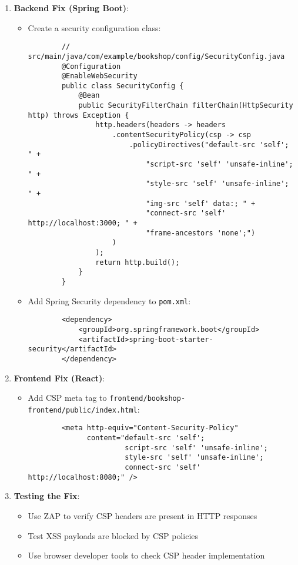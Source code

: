 \documentclass[]{UCD_CS_FYP_Report}
\begin{document}
\begin{enumerate}
    \item \textbf{Backend Fix (Spring Boot)}:
    \begin{itemize}
        \item Create a security configuration class:
        \begin{verbatim}
        // src/main/java/com/example/bookshop/config/SecurityConfig.java
        @Configuration
        @EnableWebSecurity
        public class SecurityConfig {
            @Bean
            public SecurityFilterChain filterChain(HttpSecurity http) throws Exception {
                http.headers(headers -> headers
                    .contentSecurityPolicy(csp -> csp
                        .policyDirectives("default-src 'self'; " +
                            "script-src 'self' 'unsafe-inline'; " +
                            "style-src 'self' 'unsafe-inline'; " +
                            "img-src 'self' data:; " +
                            "connect-src 'self' http://localhost:3000; " +
                            "frame-ancestors 'none';")
                    )
                );
                return http.build();
            }
        }
        \end{verbatim}
        
        \item Add Spring Security dependency to \texttt{pom.xml}:
        \begin{verbatim}
        <dependency>
            <groupId>org.springframework.boot</groupId>
            <artifactId>spring-boot-starter-security</artifactId>
        </dependency>
        \end{verbatim}
    \end{itemize}
    
    \item \textbf{Frontend Fix (React)}:
    \begin{itemize}
        \item Add CSP meta tag to \texttt{frontend/bookshop-frontend/public/index.html}:
        \begin{verbatim}
        <meta http-equiv="Content-Security-Policy" 
              content="default-src 'self'; 
                       script-src 'self' 'unsafe-inline'; 
                       style-src 'self' 'unsafe-inline'; 
                       connect-src 'self' http://localhost:8080;" />
        \end{verbatim}
    \end{itemize}
    
    \item \textbf{Testing the Fix}:
    \begin{itemize}
        \item Use ZAP to verify CSP headers are present in HTTP responses
        \item Test XSS payloads are blocked by CSP policies
        \item Use browser developer tools to check CSP header implementation
    \end{itemize}
\end{enumerate}
\end{document}
